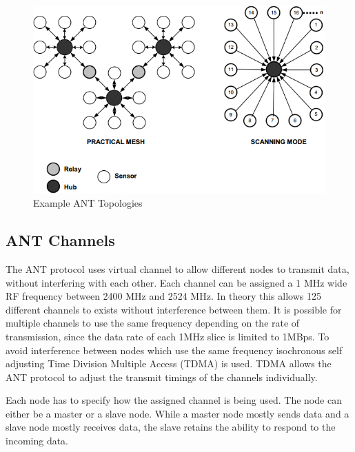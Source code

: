 \begin{figure}[H]
	\centering
	\includegraphics[scale=0.7]{content/images/ANTtopo.png}
	\caption{Example ANT Topologies\cite{DynastreamInnovationsInc.2013}}\label{fig:anttopo}
\end{figure}

\subsection{ANT Channels}
\label{sec:ANTchan}
The ANT protocol uses virtual channel to allow different nodes to transmit data, without interfering with each other. Each channel can be assigned a 1 MHz wide RF frequency between 2400 MHz and 2524 MHz. In theory this allows 125 different channels to exists without interference between them. It is possible for multiple channels to use the same frequency depending on the rate of transmission, since the data rate of each 1MHz slice is limited to 1MBps. 
To avoid interference between nodes which use the same frequency isochronous self adjusting Time Division Multiple Access (TDMA) is used. TDMA allows the ANT protocol to adjust the transmit timings of the channels individually.

Each node has to specify how the assigned channel is being used. The node can either be a master or a slave node. While a master node mostly sends data and a slave node mostly receives data, the slave retains the ability to respond to the incoming data.

